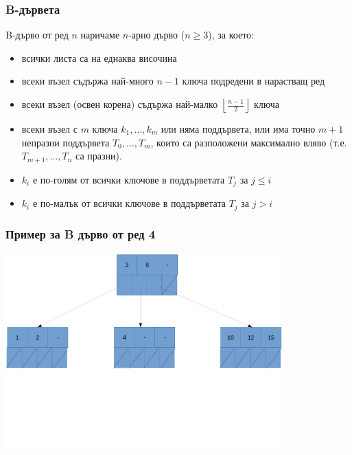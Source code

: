 \documentclass{beamer}
\begin{document}
\begin{frame}
  \frametitle{B-дървета}
  \begin{definition}[B-дърво]
    B-дърво от ред $n$ наричаме $n$-арно дърво ($n \geq 3$), за което:
    \begin{itemize}
    \item всички листа са на еднаква височина
    \item всеки възел съдържа най-много $n-1$ ключа подредени в нарастващ ред
    \item всеки възел (освен корена) съдържа най-малко $\left\lfloor\frac {n-1}2\right\rfloor$ ключа
    \item всеки възел с $m$ ключа $k_1,\ldots,k_m$ или няма поддървета, или има точно $m+1$ непразни поддървета $T_0,\ldots, T_m$, които са разположени максимално вляво (т.е. $T_{m+1},\ldots,T_n$ са празни).
    \item $k_i$ е по-голям от всички ключове в поддърветата $T_j$ за $j \leq i$
    \item $k_i$ е по-малък от всички ключове в поддърветата $T_j$ за $j > i$
    \end{itemize}
  \end{definition}
\end{frame}

\begin{frame}
  \frametitle{Пример за B дърво от ред 4}
  \begin{center}
    \includegraphics[width=0.8\textwidth]{images/btree.pdf}
  \end{center}
\end{frame}
\end{document}
